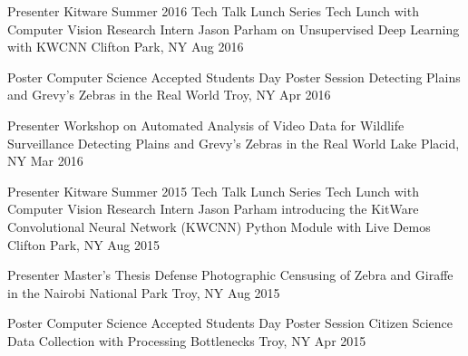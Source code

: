 

\begin{cventries}


  \cventryshort
    {Presenter \dotSep Kitware Summer 2016 Tech Talk Lunch Series} %
    {Tech Lunch with Computer Vision Research Intern Jason Parham on Unsupervised Deep Learning with KWCNN} %
    {Clifton Park, NY} %
    {Aug 2016} %

  \cventryshort
    {Poster \dotSep Computer Science Accepted Students Day Poster Session} %
    {Detecting Plains and Grevy's Zebras in the Real World} %
    {Troy, NY} %
    {Apr 2016} %

  \cventryshort
    {Presenter \dotSep {} Workshop on Automated Analysis of Video Data for Wildlife Surveillance} %
    {Detecting Plains and Grevy's Zebras in the Real World} %
    {Lake Placid, NY} %
    {Mar 2016} %

  \cventryshort
    {Presenter \dotSep Kitware Summer 2015 Tech Talk Lunch Series} %
    {Tech Lunch with Computer Vision Research Intern Jason Parham introducing the KitWare Convolutional Neural Network (KWCNN) Python Module with Live Demos} %
    {Clifton Park, NY} %
    {Aug 2015} %

  \cventryshort
    {Presenter \dotSep Master's Thesis Defense} %
    {Photographic Censusing of Zebra and Giraffe in the Nairobi National Park} %
    {Troy, NY} %
    {Aug 2015} %

  \cventryshort
    {Poster \dotSep Computer Science Accepted Students Day Poster Session} %
    {Citizen Science Data Collection with Processing Bottlenecks} %
    {Troy, NY} %
    {Apr 2015} %

\end{cventries}
